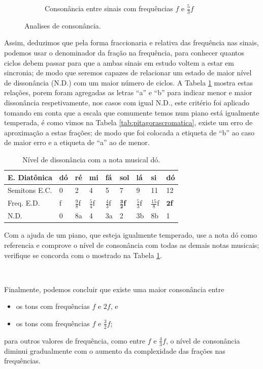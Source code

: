 \begin{figure}
\begin{subfigure}[b]{0.8\textwidth}
        \caption{Consonância entre sinais com frequências $f$ e $\frac{5}{3}f$}
        \label{fig:corda53}
    \end{subfigure}
\caption{Analises de consonância.}
\label{fig:consonanciaper}
\end{figure}

Assim, deduzimos que pela forma fraccionaria e relativa das frequência nas sinais, 
podemos usar o denominador da fração na frequência,
para conhecer quantos ciclos debem passar para que a ambas sinais em estudo voltem a estar em sincronia;
de modo que seremos capazes de relacionar um estado de maior nível de dissonância (N.D.) com um maior número de ciclos.
A Tabela \ref{tab:pitagorascromatica2} mostra estas relações, 
porem foram agregadas as letras ``a'' e ``b'' para indicar menor e maior dissonância respetivamente,
nos casos com igual N.D., este critério foi aplicado tomando em conta que a escala
que comumente temos num piano está igualmente temperada,
é como vimos na Tabela  \ref{tab:pitagorascromatica},
existe um erro de aproximação a estas frações;
de modo que foi colocada a etiqueta de ``b'' ao caso de maior erro e a etiqueta de ``a'' ao de menor.
\begin{table}[h]
  \centering
  \begin{tabular}{|l|l|l|l|l|l|l|l|l|}
  \hline
  E. Diatônica    & dó & ré & mi & fá & sol & lá & si & dó \\ \hline
  \hline
  Semitons E.C.   & 0  & 2  & 4  & 5  & 7  & 9  & 11 & 12 \\ \hline
  Freq. E.D.  & f  & $\frac{9}{8}$f & $\frac{5}{4}$f & $\frac{4}{3}$f & $\mathbf{\frac{3}{2}}$\textbf{f} & $\frac{5}{3}$f & $\frac{15}{8}$f & $\mathbf{2}$\textbf{f}\\ \hline \hline
  N.D. &  0 & 8a & 4 & 3a & 2 & 3b & 8b & 1 \\ \hline
  \end{tabular}
  \caption{Nível de dissonância com a nota musical dó.}
  \label{tab:pitagorascromatica2}
\end{table}

\begin{example}
Com a ajuda de um piano, que esteja igualmente temperado,
use a nota dó como referencia e comprove o nível de consonância com todas as demais notas musicais;
verifique se concorda com o mostrado na Tabela \ref{tab:pitagorascromatica2}.
\end{example}~


Finalmente, podemos concluir que existe uma maior consonância entre
\begin{itemize} 
\item os tons com frequências $f$ e $2f$, e 
\item os tons com frequências $f$ e $\frac{3}{2}f$;
\end{itemize}
para outros valores de frequência, 
como entre $f$ e $\frac{4}{3}f$, o nível de consonância diminui  
 gradualmente com o aumento da complexidade das frações nas frequências.

